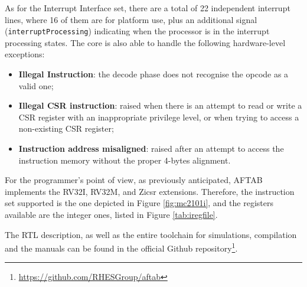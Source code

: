 As for the Interrupt Interface set, there are a total of 22 independent interrupt lines, where 16 of them are for platform use, plus an additional signal (\texttt{interruptProcessing}) indicating when the processor is in the interrupt processing states. The core is also able to handle the following hardware-level exceptions:

\begin{itemize}
\item \textbf{Illegal Instruction}: the decode phase does not recognise the opcode as a valid one;
\item \textbf{Illegal CSR instruction}: raised when there is an attempt to read or write a CSR register with an inappropriate privilege level, or when trying to access a non-existing CSR register;
\item \textbf{Instruction address misaligned}: raised after an attempt to access the instruction memory without the proper 4-bytes alignment.
\end{itemize}

For the programmer's point of view, as previously anticipated, AFTAB implements the RV32I, RV32M, and Zicsr extensions. Therefore, the instruction set supported is the one depicted in Figure \ref{fig:mc2101i}, and the registers available are the integer ones, listed in Figure \ref{tab:iregfile}.

The RTL description, as well as the entire toolchain for simulations, compilation and the manuals can be found in the official Github repository\footnote{\url{https://github.com/RHESGroup/aftab}}.